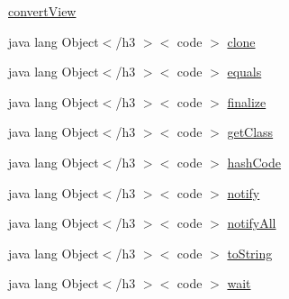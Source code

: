 \begin{DoxyCompactItemize}
\item 
\hyperlink{_sensors_list_adapter_8html_a074c9ae2abe97703c9c031be7f3eb2e5}{convert\-View}
\item 
java lang Object$<$/h3 $>$$<$ code $>$ \hyperlink{_sensors_list_adapter_8html_adc9607fcabf6f2d7f401ad52015ef6e0}{clone}
\item 
java lang Object$<$/h3 $>$$<$ code $>$ \hyperlink{_sensors_list_adapter_8html_a8974318cea585f72df717e0380ec7104}{equals}
\item 
java lang Object$<$/h3 $>$$<$ code $>$ \hyperlink{_sensors_list_adapter_8html_ab2315181ead4aeedef2374039b6ddde7}{finalize}
\item 
java lang Object$<$/h3 $>$$<$ code $>$ \hyperlink{_sensors_list_adapter_8html_a98e6644727fe65eac217a6855045be43}{get\-Class}
\item 
java lang Object$<$/h3 $>$$<$ code $>$ \hyperlink{_sensors_list_adapter_8html_a8e178e2bb2bef055ea23ea3910a221ca}{hash\-Code}
\item 
java lang Object$<$/h3 $>$$<$ code $>$ \hyperlink{_sensors_list_adapter_8html_ae99ae10b5010594dbda4794e02db271b}{notify}
\item 
java lang Object$<$/h3 $>$$<$ code $>$ \hyperlink{_sensors_list_adapter_8html_a1279357e6e09e33e75b55eb05fdb6436}{notify\-All}
\item 
java lang Object$<$/h3 $>$$<$ code $>$ \hyperlink{_sensors_list_adapter_8html_a36e8a76a4132c9a7081416f27d087615}{to\-String}
\item 
java lang Object$<$/h3 $>$$<$ code $>$ \hyperlink{_sensors_list_adapter_8html_a9a9f0c22e5688d478c707f910f1c1aea}{wait}
\end{DoxyCompactItemize}


